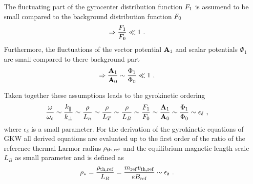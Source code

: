 \begin{itemize}
		The fluctuating part of the gyrocenter distribution function $F_1$ is assumend to be small compared to the background distribution function $F_0$ 
		\begin{gather*}
			\Rightarrow \frac{F_1}{F_0} \ll 1~.
		\end{gather*}
		Furthermore, the fluctuations of the vector potential $\boldsymbol{\mathbf{A}}_1$ and scalar potentials $\Phi_1$ are small compared to there background part
		\begin{gather*}
			\Rightarrow \frac{\boldsymbol{\mathbf{A}}_1}{\boldsymbol{\mathbf{A}}_0} \sim \frac{\Phi_1}{\Phi_0}  \ll 1~.
		\end{gather*}
\end{itemize}
Taken together these assumptions leads to the gyrokinetic ordering
\begin{gather}
	\frac{\omega}{\omega_\mathrm{c}} \sim \frac{k_\parallel}{k_\perp} \sim \frac{\rho}{L_n} \sim \frac{\rho}{L_T} \sim \frac{\rho}{L_B} \sim \frac{F_1}{F_0} \sim \frac{\boldsymbol{\mathbf{A}}_1}{\boldsymbol{\mathbf{A}}_0} \sim \frac{\Phi_1}{\Phi_0} \sim \epsilon_\delta~,
\end{gather}
where $\epsilon_\delta$ is a small parameter. For the derivation of the gyrokinetic equations of GKW all derived equations are evaluated up to the first order of the ratio of the reference thermal Larmor radius $\rho_{\mathrm{th},\mathrm{ref}}$ and the equilibrium magnetic length scale $L_B$ as small parameter and is defined as
\begin{gather}
	\rho_\star = \frac{\rho_{\mathrm{th},\mathrm{ref}}}{L_B} = \frac{m_\mathrm{ref} v_{\mathrm{th},\mathrm{ref}}}{e B_\mathrm{ref}} \sim \epsilon_\delta~.
	\label{eq:rhostar}
\end{gather}